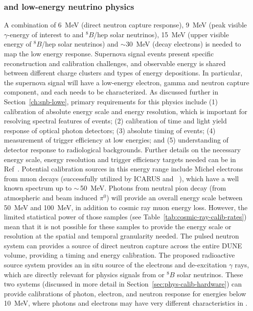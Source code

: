 \subsubsection{ and low-energy neutrino physics}
A combination of 6~MeV (direct neutron capture response), 9~MeV (peak visible $\gamma$-energy of interest to  and $^{8}B$/hep solar neutrinos), 15~MeV (upper visible energy of $^{8}B$/hep solar neutrinos) and $\sim$30~MeV (decay electrons) is needed to map the low energy response. Supernova signal events present specific reconstruction and calibration challenges, and observable energy is shared between different charge clusters and types of energy depositions. In particular, the supernova signal will have a low-energy electron, gamma and neutron capture component, and each needs to be characterized. As discussed further in Section~\ref{ch:snb-lowe}, primary requirements for this physics include 
(1) calibration of absolute energy scale and energy resolution, which is important for resolving spectral features of  events;
(2) calibration of time and light yield response of optical photon detectors;  
(3) absolute timing of events;  
(4) measurement of trigger efficiency at low energies;  and 
(5) understanding of detector response to radiological backgrounds. Further details on the necessary energy scale, energy resolution and trigger efficiency targets needed can be in Ref~\cite{bib:docdb14068}.
Potential calibration sources in this energy range include Michel electrons from muon decays (successfully utilized by ICARUS and ~\cite{Acciarri:2017sjy}), which have a well known spectrum up to $\sim\,$\SI{50}{\MeV}.
Photons from neutral pion decay (from atmospheric and beam induced $\pi^0$) will provide an overall energy scale between \SI{50}{\MeV} and \SI{100}{\MeV}, in addition to cosmic ray muon energy loss. 
However, the limited statistical power of those samples (see Table~\ref{tab:cosmic-ray-calib-rates}) mean that it is not possible for these samples to provide the energy scale or resolution at the spatial and temporal granularity needed.
The pulsed neutron system can provides a source of direct neutron capture across the entire DUNE volume, providing a timing and energy calibration.
The proposed radioactive source system provides an in situ source of the electrons and de-excitation $\gamma$ rays, which are directly relevant for physics signals from  or $^{8}B$ solar neutrinos. These two systems (discussed in more detail in Section~\ref{sec:phys-calib-hardware}) can provide calibrations of photon, electron, and neutron response for energies below \SI{10}{\MeV}, where photons and electrons may have very different characteristics in .


